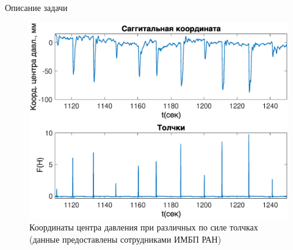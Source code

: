 \documentclass[10pt]{beamer}
\begin{document}
\begin{frame}{Описание задачи}
\begin{figure}[h!]
\begin{center}
\begin{minipage}[h]{0.66\linewidth}
				\includegraphics[width=1\linewidth]{images/sagg_and_pushes.eps}
				{\footnotesize
					\caption{Координаты центра давления при различных по силе толчках (данные предоставлены сотрудниками ИМБП РАН) }
				}
			\end{minipage}
		\end{center}
	\end{figure}
\end{frame}
\end{document}
